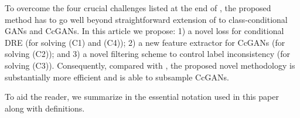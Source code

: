 \documentclass[final,12pt, 3p,times]{elsarticle}
\begin{document}
To overcome the four crucial challenges listed at the end of , the proposed method has to go well beyond straightforward extension of \cite{ding2020subsampling} to class-conditional GANs and CcGANs.  In this article we propose: 1) a novel loss for conditional DRE (for solving (C1) and (C4)); 2) a new feature extractor for CcGANs (for solving (C2)); and 3) a novel filtering scheme to control label inconsistency (for solving (C3)). Consequently, compared with \cite{ding2020subsampling}, the proposed novel methodology is substantially more efficient and is able to subsample CcGANs.

To aid the reader, we summarize in  the essential notation used in this paper along with definitions.
\end{document}
